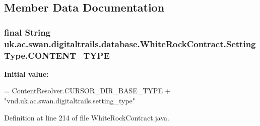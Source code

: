 \subsection{Member Data Documentation}
\hypertarget{classuk_1_1ac_1_1swan_1_1digitaltrails_1_1database_1_1_white_rock_contract_1_1_setting_type_a4e66cbc4161ad257d66a4e86f0c97d65}{
\subsubsection[{C\+O\+N\+T\+E\+N\+T\+\_\+\+T\+Y\+P\+E}]{\setlength{\rightskip}{0pt plus 5cm}final String uk.\+ac.\+swan.\+digitaltrails.\+database.\+White\+Rock\+Contract.\+Setting\+Type.\+C\+O\+N\+T\+E\+N\+T\+\_\+\+T\+Y\+P\+E\hspace{0.3cm}{\ttfamily [static]}}}\label{classuk_1_1ac_1_1swan_1_1digitaltrails_1_1database_1_1_white_rock_contract_1_1_setting_type_a4e66cbc4161ad257d66a4e86f0c97d65}
{\bfseries Initial value\+:}
\begin{DoxyCode}
= ContentResolver.CURSOR\_DIR\_BASE\_TYPE +
                \textcolor{stringliteral}{"vnd.uk.ac.swan.digitaltrails.setting\_type"}
\end{DoxyCode}


Definition at line 214 of file White\+Rock\+Contract.\+java.

